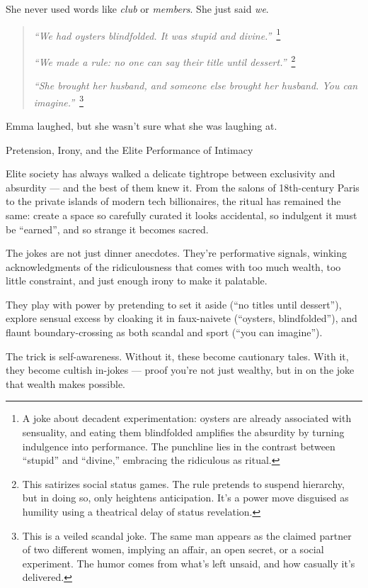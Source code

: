She never used words like \textit{club} or \textit{members}.  
She just said \textit{we}.

\begin{quote}
  \textit{``We had oysters blindfolded. It was stupid and divine.''}\ \footnote{A joke about decadent 
  experimentation: oysters are already associated with sensuality, and eating them blindfolded amplifies 
  the absurdity by turning indulgence into performance. The punchline lies in the contrast between 
  “stupid” and “divine,” embracing the ridiculous as ritual.}

  \textit{``We made a rule: no one can say their title until dessert.''}\ \footnote{This satirizes social status 
  games. The rule pretends to suspend hierarchy, but in doing so, only heightens anticipation. It’s a power 
  move disguised as humility using a theatrical delay of status revelation.}

  \textit{``She brought her husband, and someone else brought her husband. You can imagine.''}\ \footnote{This 
  is a veiled scandal joke. The same man appears as the claimed partner of two different women, implying 
  an affair, an open secret, or a social experiment. The humor comes from what’s left unsaid, and 
  how casually it's delivered.}
\end{quote}

Emma laughed, but she wasn’t sure what she was laughing at.

\medskip

\begin{HistoricalSidebar}{Pretension, Irony, and the Elite Performance of Intimacy}

  Elite society has always walked a delicate tightrope between exclusivity and absurdity — and the best 
  of them knew it. From the salons of 18th-century Paris to the private islands of modern tech 
  billionaires, the ritual has remained the same: create a space so carefully curated it looks 
  accidental, so indulgent it must be ``earned'', and so strange it becomes sacred.

  \medskip
  
  The jokes are not just dinner anecdotes. They’re performative signals, winking acknowledgments of the 
  ridiculousness that comes with too much wealth, too little constraint, and just enough irony to 
  make it palatable.

  \medskip
  
  They play with power by pretending to set it aside (“no titles until dessert”), explore sensual 
  excess by cloaking it in faux-naivete (“oysters, blindfolded”), and flaunt boundary-crossing as 
  both scandal and sport (“you can imagine”). 

  \medskip
  
  The trick is self-awareness. Without it, these become cautionary tales. With it, they become 
  cultish in-jokes — proof you’re not just wealthy, but in on the joke that wealth makes possible.
  
\end{HistoricalSidebar}


